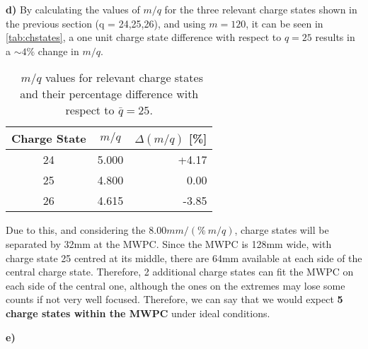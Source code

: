 \textbf{d) } By calculating the values of $m/q$ for the three relevant charge states shown in the previous section (q = {24,25,26}), and using $m=120$, it can be seen in \autoref{tab:chstates}, a one unit charge state difference with respect to $q=25$ results in a $\sim 4\%$ change in $m/q$.

\begin{table}[H]
    \caption{\la\ $m/q$ values for relevant charge states and their percentage difference with respect to $\bar q = 25$.}
    \label{tab:chstates}
\begin{tabular}{ccr}
    \hline
    Charge State & $m/q$ & \multirow{1}{*}{$\Delta(m/q)$ [\%]}\\ \hline
    24 & 5.000 & +4.17\\
    25 & 4.800 & 0.00\\
    26 & 4.615 & -3.85\\ \hline
\end{tabular}
\end{table}

Due to this, and considering the $8.00\unit{mm/(\%\ m/q)}$, charge states will be separated by 32\unit{mm} at the MWPC. Since the MWPC is 128\unit{mm} wide, with charge state 25 centred at its middle, there are 64\unit{mm} available at each side of the central charge state. Therefore, 2 additional charge states can fit the MWPC on each side of the central one, although the ones on the extremes may lose some counts if not very well focused. Therefore, we can say that we would expect \textbf{5 charge states within the MWPC} under ideal conditions.

\textbf{e) }
